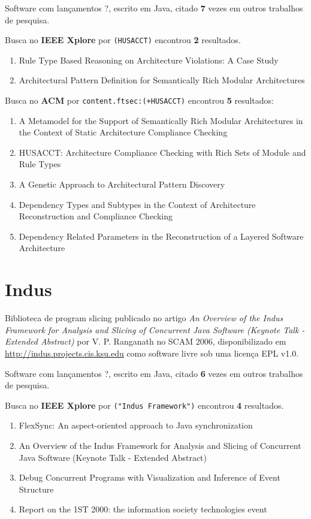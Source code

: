 Software com lançamentos ?,
escrito em Java,
citado {\bf 7} vezes em outros trabalhos de pesquisa.

Busca no {\bf IEEE Xplore} por
\texttt{(HUSACCT)}
encontrou {\bf 2}
resultados.

\begin{enumerate}
\item Rule Type Based Reasoning on Architecture Violations: A Case Study
\item Architectural Pattern Definition for Semantically Rich Modular Architectures
\end{enumerate}

Busca no {\bf ACM} por
\texttt{content.ftsec:(+HUSACCT)}
encontrou {\bf 5}
resultados:

\begin{enumerate}
\item A Metamodel for the Support of Semantically Rich Modular Architectures in the Context of Static Architecture Compliance Checking
\item HUSACCT: Architecture Compliance Checking with Rich Sets of Module and Rule Types
\item A Genetic Approach to Architectural Pattern Discovery
\item Dependency Types and Subtypes in the Context of Architecture Reconstruction and Compliance Checking
\item Dependency Related Parameters in the Reconstruction of a Layered Software Architecture
\end{enumerate}

\section{Indus}

Biblioteca de program slicing
publicado no artigo {\it An Overview of the Indus Framework for Analysis and Slicing of Concurrent Java Software (Keynote Talk - Extended Abstract)}
por V. P. Ranganath
no SCAM 2006,
disponibilizado em \url{http://indus.projects.cis.ksu.edu}
como software livre
sob uma licença EPL v1.0.

Software com lançamentos ?,
escrito em Java,
citado {\bf 6} vezes em outros trabalhos de pesquisa.

Busca no {\bf IEEE Xplore} por
\texttt{("Indus Framework")}
encontrou {\bf 4}
resultados.

\begin{enumerate}
\item FlexSync: An aspect-oriented approach to Java synchronization
\item An Overview of the Indus Framework for Analysis and Slicing of Concurrent Java Software (Keynote Talk - Extended Abstract)
\item Debug Concurrent Programs with Visualization and Inference of Event Structure
\item Report on the 1ST 2000: the information society technologies event
\end{enumerate}

